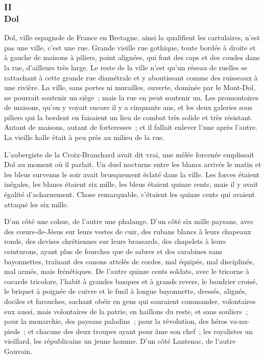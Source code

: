 \documentclass[french,twoside]{book} %
\begin{document}
 \subsubsection[{II. Dol}]{II \\
Dol}
\label{p3l2c2}
\noindent Dol, ville espagnole de France en Bretagne, ainsi la qualifient les cartulaires, n’est pas une ville, c’est une rue. Grande vieille rue gothique, toute bordée à droite et à gauche de maisons à piliers, point alignées, qui font des caps et des coudes dans la rue, d’ailleurs très large. Le reste de la ville n’est qu’un réseau de ruelles se rattachant à cette grande rue diamétrale et y aboutissant comme des ruisseaux à une rivière. La ville, sans portes ni murailles, ouverte, dominée par le Mont-Dol, ne pourrait soutenir un siège ; mais la rue en peut soutenir un. Les promontoires de maisons, qu’on y voyait encore il y a cinquante ans, et les deux galeries sous piliers qui la bordent en faisaient un lieu de combat très solide et très résistant. Autant de maisons, autant de forteresses ; et il fallait enlever l’une après l’autre. La vieille halle était à peu près au milieu de la rue.\par
L’aubergiste de la Croix-Branchard avait dit vrai, une mêlée forcenée emplissait Dol au moment où il parlait. Un duel nocturne entre les blancs arrivés le matin et les bleus survenus le soir avait brusquement  éclaté dans la ville. Les forces étaient inégales, les blancs étaient six mille, les bleus étaient quinze cents, mais il y avait égalité d’acharnement. Chose remarquable, c’étaient les quinze cents qui avaient attaqué les six mille.\par
D’un côté une cohue, de l’autre une phalange. D’un côté six mille paysans, avec des cœurs-de-Jésus sur leurs vestes de cuir, des rubans blancs à leurs chapeaux ronds, des devises chrétiennes sur leurs brassards, des chapelets à leurs ceinturons, ayant plus de fourches que de sabres et des carabines sans bayonnettes, traînant des canons attelés de cordes, mal équipés, mal disciplinés, mal armés, mais frénétiques. De l’autre quinze cents soldats, avec le tricorne à cocarde tricolore, l’habit à grandes basques et à grands revers, le baudrier croisé, le briquet à poignée de cuivre et le fusil à longue bayonnette, dressés, alignés, dociles et farouches, sachant obéir en gens qui sauraient commander, volontaires eux aussi, mais volontaires de la patrie, en haillons du reste, et sans souliers ; pour la monarchie, des paysans paladins ; pour la révolution, des héros va-nu-pieds ; et chacune des deux troupes ayant pour âme son chef ; les royalistes un vieillard, les républicains un jeune homme. D’un côté Lantenac, de l’autre Gauvain.\par
\end{document}
